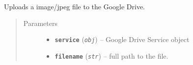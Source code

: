 \documentclass[letterpaper,10pt,english]{sphinxmanual}
\begin{document}
\begin{fulllineitems}
\begin{fulllineitems}
\label{rpicameramon:rpicameramon.telemetry.GoogleHandler.upload_file}
Uploads a image/jpeg file to the Google Drive.
\begin{quote}\begin{description}
\item[{Parameters}] \leavevmode\begin{itemize}
\item {} 
\textbf{\texttt{service}} (\emph{\texttt{obj}}) -- Google Drive Service object

\item {} 
\textbf{\texttt{filename}} (\emph{\texttt{str}}) -- full path to the file.

\end{itemize}

\end{description}\end{quote}

\end{fulllineitems}


\end{fulllineitems}

\end{document}
